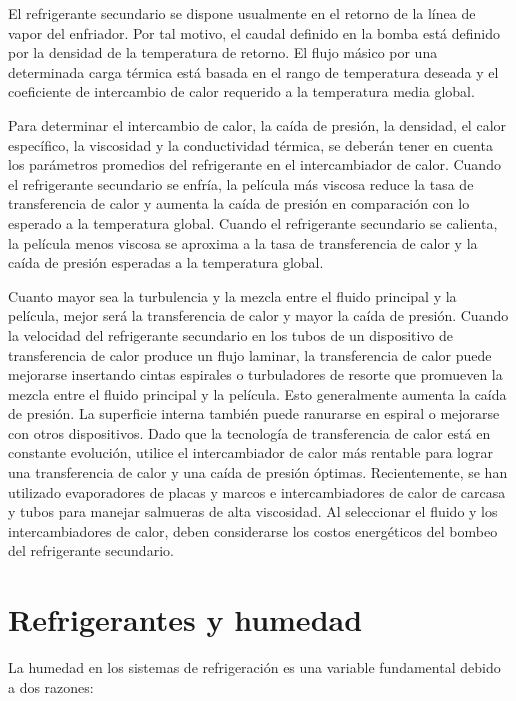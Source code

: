 	El refrigerante secundario se dispone usualmente en el retorno de la línea de vapor del enfriador. Por tal motivo, el caudal definido en la bomba está definido por la densidad de la temperatura de retorno. El flujo másico por una determinada carga térmica está basada en el rango de temperatura deseada y el coeficiente de intercambio de calor requerido a la temperatura media global.

	Para determinar el intercambio de calor, la caída de presión, la densidad, el calor específico, la viscosidad y la conductividad térmica, se deberán tener en cuenta los parámetros promedios del refrigerante en el intercambiador de calor. Cuando el refrigerante secundario se enfría, la película más viscosa reduce la tasa de transferencia de calor y aumenta la caída de presión en comparación con lo esperado a la temperatura global. Cuando el refrigerante secundario se calienta, la película menos viscosa se aproxima a la tasa de transferencia de calor y la caída de presión esperadas a la temperatura global.

	Cuanto mayor sea la turbulencia y la mezcla entre el fluido principal y la película, mejor será la transferencia de calor y mayor la caída de presión. Cuando la velocidad del refrigerante secundario en los tubos de un dispositivo de transferencia de calor produce un flujo laminar, la transferencia de calor puede mejorarse insertando cintas espirales o turbuladores de resorte que promueven la mezcla entre el fluido principal y la película. Esto generalmente aumenta la caída de presión. La superficie interna también puede ranurarse en espiral o mejorarse con otros dispositivos. Dado que la tecnología de transferencia de calor está en constante evolución, utilice el intercambiador de calor más rentable para lograr una transferencia de calor y una caída de presión óptimas. Recientemente, se han utilizado evaporadores de placas y marcos e intercambiadores de calor de carcasa y tubos para manejar salmueras de alta viscosidad. Al seleccionar el fluido y los intercambiadores de calor, deben considerarse los costos energéticos del bombeo del refrigerante secundario.

	\section{Refrigerantes y humedad}

	La humedad en los sistemas de refrigeración es una variable fundamental debido a dos razones:

